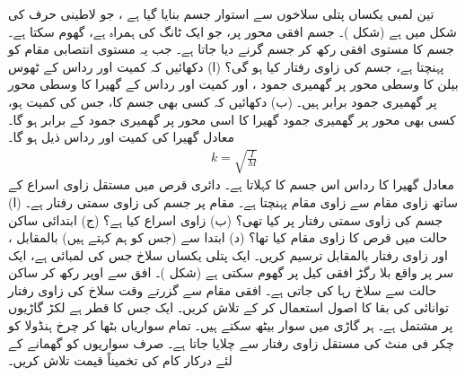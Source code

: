 تین  لمبی  یکساں پتلی سلاخوں سے استوار جسم بنایا گیا ہے ، جو لاطینی حرف  کی شکل میں ہے (شکل )۔ جسم   افقی محور پر، جو ایک ٹانگ     کی  ہمراہ ہے،  گھوم سکتا ہے۔ جسم کا مستوی افقی رکھ کر جسم  گرنے دیا جاتا ہے۔ جب یہ مستوی انتصابی مقام کو پہنچتا ہے، جسم کی زاوی رفتار کیا ہو گی؟
(ا) دکھائیں کہ   کمیت  اور رداس    کے ٹھوس بیلن کا وسطی  محور پر گھمیری جمود ، اور   کمیت  اور رداس   کے  گھیرا  کا وسطی محور پر گھمیری جمود برابر ہیں۔ (ب)  دکھائیں کہ  کسی بھی جسم کا، جس کی کمیت  ہو، کسی بھی محور پر   گھمیری جمود    گھیرا  کا اسی محور پر  گھمیری جمود  کے برابر ہو گا۔ معادل گھیرا کی کمیت  اور رداس  ذیل ہو گا۔
\begin{align*}
k=\sqrt{\frac{I}{M}}
\end{align*}
معادل گھیرا  کا رداس  اس جسم کا کہلاتا ہے۔
دائری قرص  میں مستقل زاوی اسراع کے ساتھ زاوی مقام  سے زاوی مقام  پہنچتا ہے۔ مقام  پر جسم کی زاوی سمتی رفتار  ہے۔ (ا)  جسم کی زاوی سمتی  رفتار  پر کیا تھی؟ (ب)  زاوی اسراع کیا ہے؟ (ج) ابتدائی ساکن حالت میں قرص کا زاوی مقام کیا تھا؟ (د)   ابتدا  سے (جس کو ہم   کہتے ہیں)    بالمقابل ، اور زاوی رفتار  بالمقابل  ترسیم کریں۔
ایک پتلی یکساں سلاخ جس کی لمبائی  ہے، ایک سر پر واقع بلا رگڑ  افقی کیل پر گھوم سکتی ہے (شکل )۔ افق سے  اوپر رکھ کر   ساکن حالت سے  سلاخ  رہا کی جاتی ہے۔ افقی مقام سے گزرتے وقت سلاخ کی زاوی رفتار  توانائی کی بقا کا اصول  استعمال کر کے تلاش کریں۔
ایک   جس کا قطر  ہے  لکڑ گاڑیوں پر مشتمل ہے۔ ہر گاڑی میں  سوار بیٹھ سکتے ہیں۔ تمام  سواریاں  بٹھا کر  چرخ ہنڈولا  کو  چکر فی   منٹ  کی مستقل زاوی رفتار سے چلایا جاتا ہے۔ صرف سواریوں  کو گھمانے کے لئے  درکار کام کی تخمیناً قیمت تلاش کریں۔

